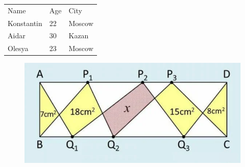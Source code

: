 \documentclass{article}
\begin{document}
\begin{tabular}{lll}
Name & Age & City \\
Konstantin & 22 & Moscow \\
Aidar & 30 & Kazan \\
Olesya & 23 & Moscow \\
\end{tabular}

\begin{figure}[h!]
\centering
\includegraphics{artifacts/geometry.png}
\end{figure}
\end{document}
